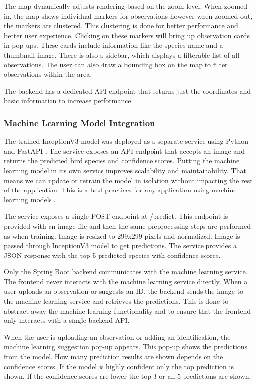 The map dynamically adjusts rendering based on the zoom level. When zoomed in, the map shows individual markers for observations however when zoomed out, the markers are clustered.
This clustering is done for better performance and better user experience.
Clicking on these markers will bring up observation cards in pop-ups.
These cards include information like the species name and a thumbnail image.
There is also a sidebar, which displays a filterable list of all observations.
The user can also draw a bounding box on the map to filter observations within the area.

The backend has a dedicated API endpoint that returns just the coordinates and basic information to increase performance.

\subsubsection{Machine Learning Model Integration}

The trained InceptionV3 model was deployed as a separate service using Python \cite{python2025} and FastAPI \cite{fastapi2025}.
The service exposes an API endpoint that accepts an image and returns the predicted bird species and confidence scores. 
Putting the machine learning model in its own service improves scalability and maintainability. 
That means we can update or retrain the model in isolation without impacting the rest of the application.
This is a best practices for any application using machine learning models \cite{karanam2026microservice}.

The service exposes a single POST endpoint at /predict. This endpoint is provided with an image file and then the same preprocessing steps are performed as when training.
Image is resized to 299x299 pixels and normalized. Image is passed through InceptionV3 model to get predictions. The service provides a JSON response \cite{bray2017json} with the top 5 predicted species with confidence scores.

Only the Spring Boot backend \cite{springboot2025} communicates with the machine learning service. The frontend never interacts with the machine learning service directly. 
When a user uploads an observation or suggests an ID, the backend sends the image to the machine learning service and retrieves the predictions.
This is done to abstract away the machine learning functionality and to ensure that the frontend only interacts with a single backend API.

When the user is uploading an observation or adding an identification, the machine learning suggestion pop-up appears.
This pop-up shows the predictions from the model. How many prediction results are shown depends on the confidence scores. 
If the model is highly confident only the top prediction is shown. If the confidence scores are lower the top 3 or all 5 predictions are shown.

